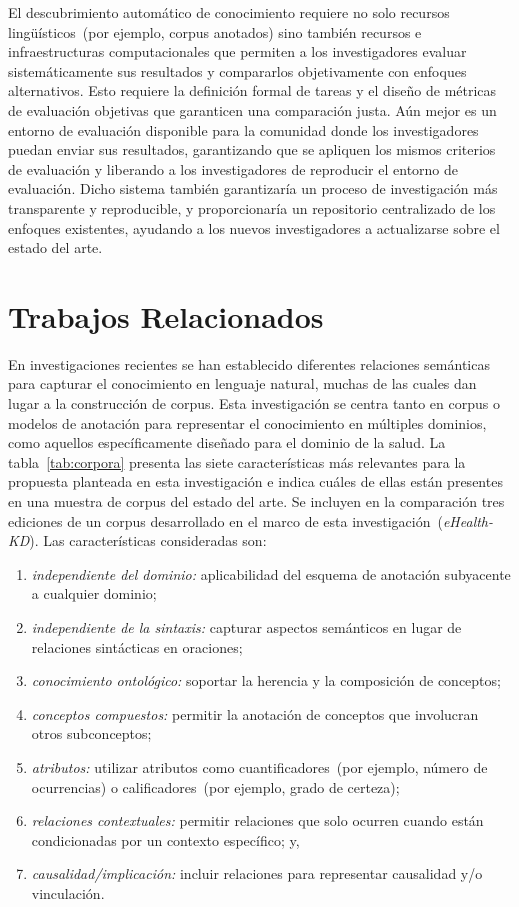 El descubrimiento automático de conocimiento requiere no solo recursos lingüísticos~(por ejemplo, corpus anotados) sino también recursos e infraestructuras computacionales que permiten a los investigadores evaluar sistemáticamente sus resultados y compararlos objetivamente con enfoques alternativos.
Esto requiere la definición formal de tareas y el diseño de métricas de evaluación objetivas que garanticen una comparación justa.
Aún mejor es un entorno de evaluación disponible para la comunidad donde los investigadores puedan enviar sus resultados, garantizando que se apliquen los mismos criterios de evaluación y liberando a los investigadores de reproducir el entorno de evaluación. Dicho sistema también garantizaría un proceso de investigación más transparente y reproducible, y proporcionaría un repositorio centralizado de los enfoques existentes, ayudando a los nuevos investigadores a actualizarse sobre el estado del arte.

\section{Trabajos Relacionados}
\label{chap1:related}

En investigaciones recientes se han establecido diferentes relaciones semánticas para capturar el conocimiento en lenguaje natural, muchas de las cuales dan lugar a la construcción de corpus. Esta investigación se centra tanto en corpus o modelos de anotación para representar el conocimiento en múltiples dominios, como aquellos específicamente diseñado para el dominio de la salud.
La tabla~\ref{tab:corpora} presenta las siete características más relevantes para la propuesta planteada en esta investigación e indica cuáles de ellas están presentes en una muestra de corpus del estado del arte.
Se incluyen en la comparación tres ediciones de un corpus desarrollado en el marco de esta investigación~(\textit{eHealth-KD}).
Las características consideradas son:
\begin{enumerate}
\item \textit{independiente del dominio:} aplicabilidad del esquema de anotación subyacente a cualquier dominio; 
\item \textit{independiente de la sintaxis:} capturar aspectos semánticos en lugar de relaciones sintácticas en oraciones; 
\item \textit{conocimiento ontológico:} soportar la herencia y la composición de conceptos;
\item \textit{conceptos compuestos:} permitir la anotación de conceptos que involucran otros subconceptos; 
\item \textit{atributos:} utilizar atributos como cuantificadores~(por ejemplo, número de ocurrencias) o calificadores~(por ejemplo, grado de certeza);
\item \textit{relaciones contextuales:} permitir relaciones que solo ocurren cuando están condicionadas por un contexto específico; y,
\item \textit{causalidad/implicación:} incluir relaciones para representar causalidad y/o vinculación.
\end{enumerate}

